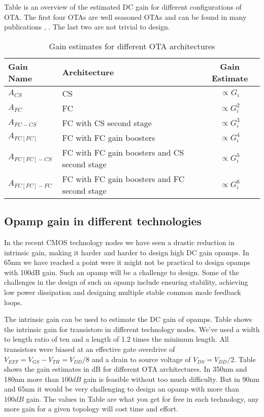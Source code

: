 Table \label{tab:otagain} is an overview of the estimated DC gain for
different configurations of OTA. The first four OTAs  are well seasoned
OTAs and can be found in many publications \cite{berntsen05}, \cite{ahmed05}. The last
two are not trivial to design.

\begin{table}[ht]
\caption{Gain estimates for different OTA architectures}
\centering 
\begin{tabular}{ l | l | c }

\label{tab:otagain}
Gain Name&Architecture & Gain Estimate\\
\hline 
$A_{CS}$&CS & $\propto G_i$\\\hline 
$A_{FC}$&FC & $\propto G_i^2$\\\hline 
$A_{FC-CS}$&FC with CS second stage & $\propto G_i^3$\\\hline 
$A_{FC[FC]}$&FC with FC gain boosters & $\propto G_i^4$\\\hline 
$A_{FC[FC]-CS}$&FC with FC gain boosters and CS second stage & $\propto G_i^5$\\\hline 
$A_{FC[FC]-FC}$&FC with FC gain boosters and FC second stage & $\propto G_i^6$\\
\end{tabular}
\end{table}


\subsection{Opamp gain in different technologies}

In the recent CMOS technology nodes we have seen a drastic reduction in
intrinsic gain, making it harder and harder to design high DC gain
opamps. In 65nm we have reached a point were it might not be practical
to design opamps with 100dB gain. Such an opamp will be a challenge
to design. Some of the challenges in the design of
such an opamp include ensuring stability, achieving low power
dissipation and designing multiple stable common mode
feedback loops.

The intrinsic gain can be used to estimate the DC gain of
opamps. Table \label{tab:ingain} shows the intrinsic gain for
transistors in different technology nodes. We've used a width to
length ratio of ten and a length of 1.2 times the minimum length. All
transistors were biased at an effective gate overdrive of $V_{EFF} = V_{GS} - V_{TH} =
V_{DD}/8$ and a drain to source voltage of $V_{DS} =
V_{DD}/2$. Table \label{tab:ingain} shows the gain estimates in dB for different
OTA architectures. In 350nm and 180nm  more than $100dB$ gain is feasible without
too much difficulty. But in 90nm and 65nm it would be very challenging
to design an opamp with more than $100dB$ gain. The
values in Table \label{tab:ingain} are what you get for free in each
technology, any more gain for a given topology will cost time and
effort.

